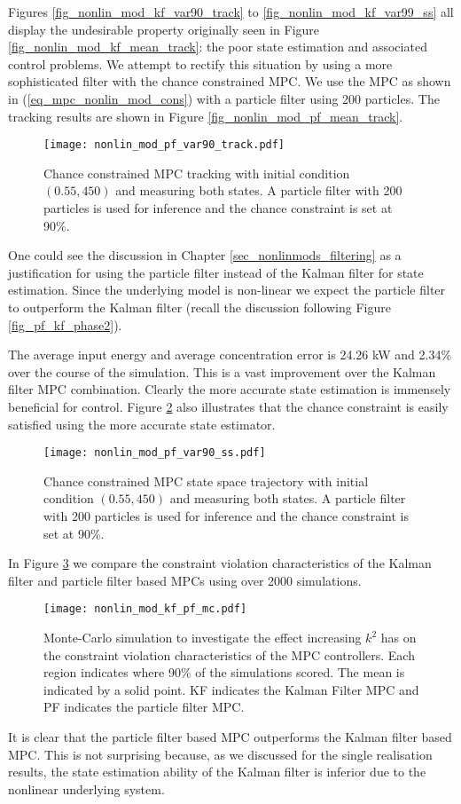 Figures \ref{fig_nonlin_mod_kf_var90_track} to \ref{fig_nonlin_mod_kf_var99_ss} all display the undesirable property originally seen in Figure \ref{fig_nonlin_mod_kf_mean_track}: the poor state estimation and associated control problems. We attempt to rectify this situation by using a more sophisticated filter with the chance constrained MPC. We use the MPC as shown in (\ref{eq_mpc_nonlin_mod_cons}) with a particle filter using 200 particles. The tracking results are shown in Figure \ref{fig_nonlin_mod_pf_mean_track}. 
\begin{figure}[H] 
\centering
\texttt{[image: nonlin\_mod\_pf\_var90\_track.pdf]}
\caption{Chance constrained MPC tracking with initial condition $(0.55, 450)$ and measuring both states. A particle filter with 200 particles is used for inference and the chance constraint is set at 90\%.}
\label{fig_nonlin_mod_pf_var90_track}
\end{figure}
One could see the discussion in Chapter \ref{sec_nonlinmods_filtering} as a justification for using the particle filter instead of the Kalman filter for state estimation. Since the underlying model is non-linear we expect the particle filter to outperform the Kalman filter (recall the discussion following Figure \ref{fig_pf_kf_phase2}).

The average input energy and average concentration error is 24.26 kW and 2.34\% over the course of the simulation. This is a vast improvement over the Kalman filter MPC combination. Clearly the more accurate state estimation is immensely beneficial for control. Figure \ref{fig_nonlin_mod_pf_var90_ss} also illustrates that the chance constraint is easily satisfied using the more accurate state estimator.
\begin{figure}[H] 
\centering
\texttt{[image: nonlin\_mod\_pf\_var90\_ss.pdf]}
\caption{Chance constrained MPC state space trajectory with initial condition $(0.55, 450)$ and measuring both states. A particle filter with 200 particles is used for inference and the chance constraint is set at 90\%.}
\label{fig_nonlin_mod_pf_var90_ss}
\end{figure}
In Figure \ref{fig_nonlin_mod_pf_mc} we compare the constraint violation characteristics of the Kalman filter and particle filter based MPCs using over 2000 simulations. 
\begin{figure}[H] 
\centering
\texttt{[image: nonlin\_mod\_kf\_pf\_mc.pdf]}
\caption{Monte-Carlo simulation to investigate the effect increasing $k^2$ has on the constraint violation characteristics of the MPC controllers. Each region indicates where 90\% of the simulations scored. The mean is indicated by a solid point. KF indicates the Kalman Filter MPC and PF indicates the particle filter MPC.}
\label{fig_nonlin_mod_pf_mc}
\end{figure}
It is clear that the particle filter based MPC outperforms the Kalman filter based MPC. This is not surprising because, as we discussed for the single realisation results, the state estimation ability of the Kalman filter is inferior due to the nonlinear underlying system.

